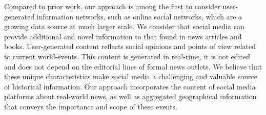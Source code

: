 Compared to prior work, our approach is among the first to consider user-generated
information networks, such as online social networks, which are a growing data
source at much larger scale.  
%
We consider that social media can provide additional and novel information to
that found in news articles and books. 
%
User-generated content reflects social opinions and points of view related to
current world-events. 
%
This content is generated in real-time, it is not edited and does not depend on
the editorial lines of formal news outlets.  
%
We believe that these unique characteristics make social media a challenging and
valuable source of historical information.  
%
Our approach incorporates the content of social media platforms about real-world
news, as well as aggregated geographical information that conveys the importance
and scope of these events.

%
